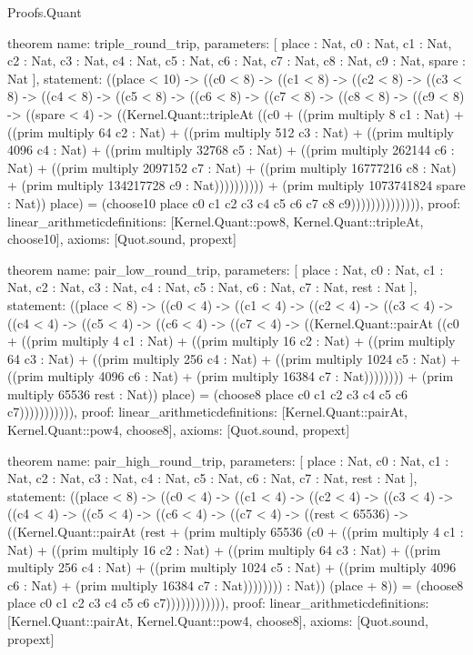 \begin{lexlean}{Proofs.Quant}
\begin{semanticmodule}
theorem{
  name: triple_round_trip,
  parameters: [
    place : Nat,
    c0 : Nat,
    c1 : Nat,
    c2 : Nat,
    c3 : Nat,
    c4 : Nat,
    c5 : Nat,
    c6 : Nat,
    c7 : Nat,
    c8 : Nat,
    c9 : Nat,
    spare : Nat
  ],
  statement: ((place < 10) -> ((c0 < 8) -> ((c1 < 8) -> ((c2 < 8) -> ((c3 < 8) -> ((c4 < 8) -> ((c5 < 8) -> ((c6 < 8) -> ((c7 < 8) -> ((c8 < 8) -> ((c9 < 8) -> ((spare < 4) -> ((Kernel.Quant::tripleAt ((c0 + ((prim multiply 8 c1 : Nat) + ((prim multiply 64 c2 : Nat) + ((prim multiply 512 c3 : Nat) + ((prim multiply 4096 c4 : Nat) + ((prim multiply 32768 c5 : Nat) + ((prim multiply 262144 c6 : Nat) + ((prim multiply 2097152 c7 : Nat) + ((prim multiply 16777216 c8 : Nat) + (prim multiply 134217728 c9 : Nat)))))))))) + (prim multiply 1073741824 spare : Nat)) place) = (choose10 place c0 c1 c2 c3 c4 c5 c6 c7 c8 c9)))))))))))))),
  proof: linear_arithmetic{definitions: [Kernel.Quant::pow8, Kernel.Quant::tripleAt, choose10]},
  axioms: [Quot.sound, propext]
}

theorem{
  name: pair_low_round_trip,
  parameters: [
    place : Nat,
    c0 : Nat,
    c1 : Nat,
    c2 : Nat,
    c3 : Nat,
    c4 : Nat,
    c5 : Nat,
    c6 : Nat,
    c7 : Nat,
    rest : Nat
  ],
  statement: ((place < 8) -> ((c0 < 4) -> ((c1 < 4) -> ((c2 < 4) -> ((c3 < 4) -> ((c4 < 4) -> ((c5 < 4) -> ((c6 < 4) -> ((c7 < 4) -> ((Kernel.Quant::pairAt ((c0 + ((prim multiply 4 c1 : Nat) + ((prim multiply 16 c2 : Nat) + ((prim multiply 64 c3 : Nat) + ((prim multiply 256 c4 : Nat) + ((prim multiply 1024 c5 : Nat) + ((prim multiply 4096 c6 : Nat) + (prim multiply 16384 c7 : Nat)))))))) + (prim multiply 65536 rest : Nat)) place) = (choose8 place c0 c1 c2 c3 c4 c5 c6 c7))))))))))),
  proof: linear_arithmetic{definitions: [Kernel.Quant::pairAt, Kernel.Quant::pow4, choose8]},
  axioms: [Quot.sound, propext]
}

theorem{
  name: pair_high_round_trip,
  parameters: [
    place : Nat,
    c0 : Nat,
    c1 : Nat,
    c2 : Nat,
    c3 : Nat,
    c4 : Nat,
    c5 : Nat,
    c6 : Nat,
    c7 : Nat,
    rest : Nat
  ],
  statement: ((place < 8) -> ((c0 < 4) -> ((c1 < 4) -> ((c2 < 4) -> ((c3 < 4) -> ((c4 < 4) -> ((c5 < 4) -> ((c6 < 4) -> ((c7 < 4) -> ((rest < 65536) -> ((Kernel.Quant::pairAt (rest + (prim multiply 65536 (c0 + ((prim multiply 4 c1 : Nat) + ((prim multiply 16 c2 : Nat) + ((prim multiply 64 c3 : Nat) + ((prim multiply 256 c4 : Nat) + ((prim multiply 1024 c5 : Nat) + ((prim multiply 4096 c6 : Nat) + (prim multiply 16384 c7 : Nat)))))))) : Nat)) (place + 8)) = (choose8 place c0 c1 c2 c3 c4 c5 c6 c7)))))))))))),
  proof: linear_arithmetic{definitions: [Kernel.Quant::pairAt, Kernel.Quant::pow4, choose8]},
  axioms: [Quot.sound, propext]
}


\end{semanticmodule}
\end{lexlean}
